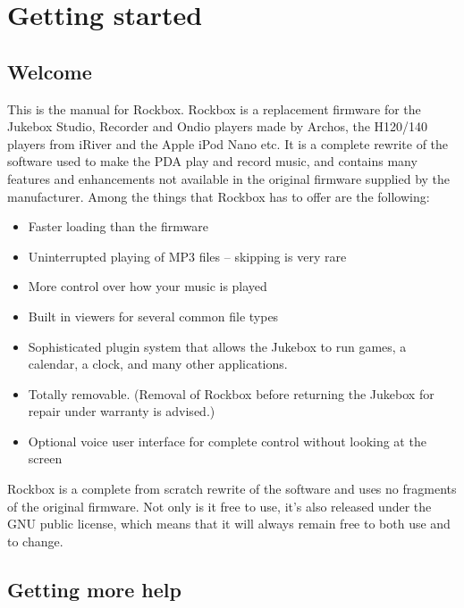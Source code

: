 \chapter{Getting started}
\newpage
\section{Welcome}
This is the manual for Rockbox.  Rockbox is a replacement firmware for the
Jukebox Studio, Recorder and Ondio players made by Archos, the H120/140
players from iRiver and the Apple iPod Nano etc.  It is a complete rewrite of
the software used to make the PDA play and record music, and contains many
features and enhancements not available in the original firmware supplied by
the manufacturer.  Among the things that Rockbox has to offer are the
following:

\begin{itemize}
\item Faster loading than the \playername firmware
\item Uninterrupted playing of MP3 files {--} skipping is very rare
\item More control over how your music is played
\item Built in viewers for several common file types
\item Sophisticated plugin system that allows the Jukebox to run games,
a calendar, a clock, and many other applications.
\item Totally removable. (Removal of Rockbox before returning the
Jukebox for repair under warranty is advised.)
\item Optional voice user interface for complete control without looking
at the screen
\end{itemize}
Rockbox is a complete from scratch rewrite of the \playername software and
uses no fragments of the original firmware.  Not only is it free to
use, it's also released under the GNU public license,
which means that it will always remain free to both use and to change.


\section{Getting more help}

